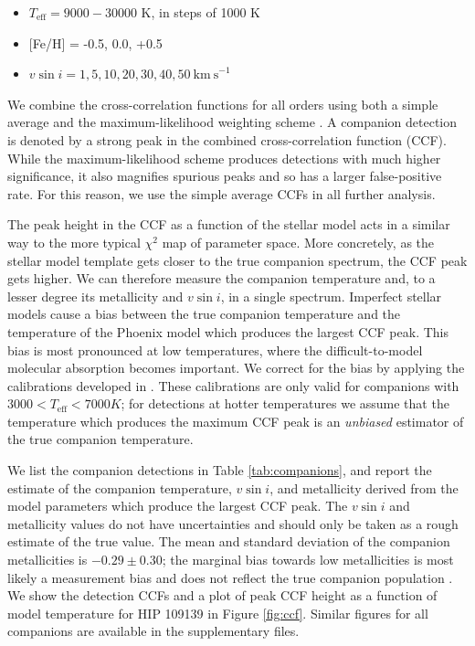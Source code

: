\documentclass{emulateapj}
\begin{document}
\begin{itemize}
\item $T_\mathrm{eff} = 9000-30000$ K, in steps of 1000 K
\item {[}Fe/H{]} = -0.5, 0.0, +0.5
\item $v\sin{i} = 1, 5, 10, 20, 30, 40, 50 \ \mathrm{km\ s}^{-1}$
\end{itemize}

We combine the cross-correlation functions for all orders using both a simple average and the maximum-likelihood weighting scheme \citep{Zucker2003}. A companion detection is denoted by a strong peak in the combined cross-correlation function (CCF). While the maximum-likelihood scheme produces detections with much higher significance, it also magnifies spurious peaks and so has a larger false-positive rate. For this reason, we use the simple average CCFs in all further analysis.

The peak height in the CCF as a function of the stellar model acts in a similar way to the more typical $\chi^2$ map of parameter space. More concretely, as the stellar model template gets closer to the true companion spectrum, the CCF peak gets higher. We can therefore measure the companion temperature and, to a lesser degree its metallicity and $v\sin{i}$, in a single spectrum. Imperfect stellar models cause a bias between the true companion temperature and the temperature of the Phoenix model which produces the largest CCF peak. This bias is most pronounced at low temperatures, where the difficult-to-model molecular absorption becomes important. We correct for the bias by applying the calibrations developed in \citet{Gullikson2016}. These calibrations are only valid for companions with $3000 < T_\mathrm{eff} < 7000 K$; for detections at hotter temperatures we assume that the temperature which produces the maximum CCF peak is an \emph{unbiased} estimator of the true companion temperature.

We list the companion detections in Table \ref{tab:companions}, and report the estimate of the companion temperature, $v\sin{i}$, and metallicity derived from the model parameters which produce the largest CCF peak. The $v\sin{i}$ and metallicity values do not have uncertainties and should only be taken as a rough estimate of the true value. The mean and standard deviation of the companion metallicities is $-0.29 \pm 0.30$; the marginal bias towards low metallicities is most likely a measurement bias and does not reflect the true companion population \citep{Gullikson2016}.  We show the detection CCFs and a plot of peak CCF height as a function of model temperature for HIP 109139 in Figure \ref{fig:ccf}. Similar figures for all companions are available in the supplementary files.
\end{document}
